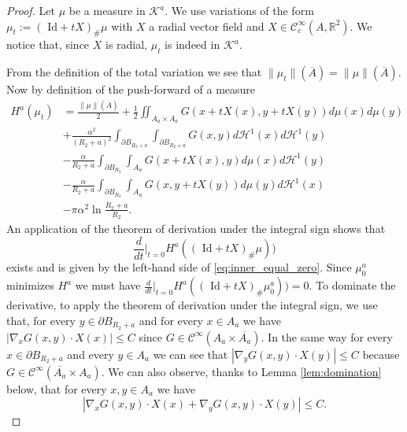 \documentclass[12pt,reqno]{amsart}
\def\C{{\mathcal C}}
\def \p {\partial}
\newcommand{\R}{\mathbb{R}}
\numberwithin{equation}{section}
\begin{document}
\begin{proof}
Let \(\mu\) be a measure in \(\mathcal{K}^a\). We use variations of the form \(\mu_t:=(\text{ Id} +tX)_\# \mu\) with \(X\) a radial vector field and \(X\in \C^\infty_c(A,\R^2)\). We notice that, since \(X\) is radial, \(\mu_t\) is indeed in \(\mathcal{K}^a\).

From the definition of the total variation we see that \(\| \mu_t\|(\overline{A})=\| \mu\|(\overline{A})\). Now
by definition of the push-forward of a measure
\begin{align*}
H^a(\mu_t)&= \frac{\|\mu\|(\overline{A})}{2}+\frac12 \iint_{A_a\times A_a} G(x+tX(x),y+tX(y)) d\mu(x) d\mu(y) \\
& +\frac{\alpha^2}{(R_2+a)^2} \int_{\p B_{R_2+a}}\int_{\p B_{R_2+a}} G(x,y) d\mathcal{H}^1(x) d \mathcal{H}^1(y) \\
&- \frac{\alpha}{R_2+a} \int_{\p B_{R_2}}\int_{A_a} G(x+tX(x),y) d\mu(x) d \mathcal{H}^1(y) \\
&- \frac{\alpha}{R_2+a} \int_{\p B_{R_2}} \int_{A_a} G(x,y+tX(y)) d\mu(y) d \mathcal{H}^1(x)\\
&-\pi \alpha^2\ln \frac{R_2+a}{R_2}.
\end{align*}
An application of the theorem of derivation under the integral sign shows that \[\frac{d}{dt}\Big|_{t=0 }H^a((\text{ Id} +tX)_\# \mu))\] exists and is given by the left-hand side of \eqref{eq:inner_equal_zero}. Since \(\mu_0^a\) minimizes \(H^a\) we must have \(\frac{d}{dt}\Big|_{t=0 }H^a((\text{ Id} +tX)_\# \mu_0^a))=0\).  To dominate the derivative, to apply the theorem of derivation under the integral sign,  we use that, for every \(y\in \p B_{R_2+a}\) and for every \(x\in A_a\) we have \(|\nabla_xG(x,y)\cdot X(x)|\leq C\) since \(G\in \C^\infty(A_a\times \overline{A_a})\). In the same way for every \(x\in \p B_{R_2+a}\) and every \(y \in A_a\) we can see that \(|\nabla_yG(x,y)\cdot X(y)|\leq C\) because \(G\in \C^\infty(\overline{A_a}\times A_a)\). We can also observe, thanks to  Lemma \ref{lem:domination} below, that for every \(x,y \in A_a\) we have 
\[ | \nabla_xG(x,y)\cdot X(x)+\nabla_yG(x,y)\cdot X(y)|\leq C.\]
\end{proof}
\end{document}
